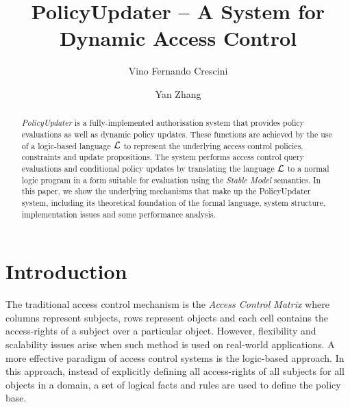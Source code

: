 \documentclass[glov2,twocolumn,final]{svjour2}
\begin{document}
  \title{PolicyUpdater -- A System for Dynamic Access Control}
  \author{Vino Fernando Crescini \and Yan Zhang}
  \date{\notused}
  \maketitle

  \begin{abstract}
    {\em PolicyUpdater} is a fully-implemented authorisation system that
    provides policy evaluations as well as dynamic policy updates. These
    functions are achieved by the use of a logic-based language ${\cal L}$ to
    represent the underlying access control policies, constraints and update
    propositions. The system performs access control query evaluations and
    conditional policy updates by translating the language $\cal{L}$ to a
    normal logic program in a form suitable for evaluation using the
    {\em Stable Model} semantics. In this paper, we show the underlying
    mechanisms that make up the PolicyUpdater system, including its theoretical
    foundation of the formal language, system structure, implementation issues
    and some performance analysis.
  \end{abstract}


  \section{Introduction}

    The traditional access control mechanism is the {\em Access Control Matrix}
    where columns represent subjects, rows represent objects and each cell
    contains the access-rights of a subject over a particular object. However,
    flexibility and scalability issues arise when such method is used on
    real-world applications. A more effective paradigm of access control
    systems is the logic-based approach. In this approach, instead of
    explicitly defining all access-rights of all subjects for all objects
    in a domain, a set of logical facts and rules are used to define the
    policy base.
\end{document}
